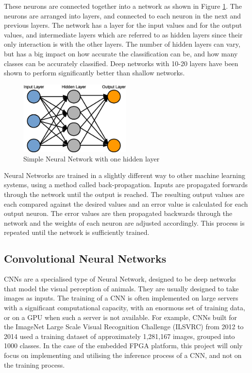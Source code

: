 \documentclass[12pt]{article}
\begin{document}
These neurons are connected together into a network as shown in Figure \ref{fig:ANN}. The neurons are arranged into layers, and connected to each neuron in the next and previous layers. The network has a layer for the input values and for the output values, and intermediate layers which are referred to as hidden layers since their only interaction is with the other layers. The number of hidden layers can vary, but has a big impact on how accurate the classification can be, and how many classes can be accurately classified. Deep networks with 10-20 layers have been shown to perform significantly better than shallow networks\cite{DeepNetworks}.

\begin{figure}[H]
\centering
\includegraphics[width=0.5\textwidth]{figures/ANN.eps}
\caption{Simple Neural Network with one hidden layer}
\label{fig:ANN}
\end{figure}

Neural Networks are trained in a slightly different way to other machine learning systems, using a method called back-propagation. Inputs are propagated forwards through the network until the output is reached. The resulting output values are each compared against the desired values and an error value is calculated for each output neuron. The error values are then propagated backwards through the network and the weights of each neuron are adjusted accordingly. This process is repeated until the network is sufficiently trained.

\subsection{Convolutional Neural Networks}
\label{sec:Background-CNN}

CNNs are a specialised type of Neural Network, designed to be deep networks that model the visual perception of animals. They are usually designed to take images as inputs. The training of a CNN is often implemented on large servers with a significant computational capacity, with an enormous set of training data, or on a GPU when such a server is not available. For example, CNNs built for the ImageNet Large Scale Visual Recognition Challenge (ILSVRC) from 2012 to 2014 used a training dataset of approximately 1,281,167  images, grouped into 1000 classes\cite{ILSVRC}. In the case of the embedded FPGA platform, this project will only focus on implementing and utilising the inference process of a CNN, and not on the training process.
\end{document}
